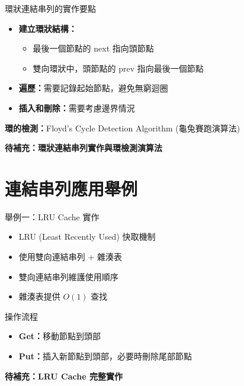 \documentclass{beamer}
\begin{document}
\begin{frame}{環狀連結串列的實作要點}
\begin{itemize}
    \item \textbf{建立環狀結構：}
    \begin{itemize}
        \item 最後一個節點的 next 指向頭節點
        \item 雙向環狀中，頭節點的 prev 指向最後一個節點
    \end{itemize}
    \item \textbf{遍歷：}需要記錄起始節點，避免無窮迴圈
    \item \textbf{插入和刪除：}需要考慮邊界情況
\end{itemize}

\vspace{1em}
\textbf{環的檢測：}Floyd's Cycle Detection Algorithm (龜兔賽跑演算法)

\vspace{1em}
\textbf{待補充：環狀連結串列實作與環檢測演算法}
\end{frame}

\section{連結串列應用舉例}

\begin{frame}{舉例一：LRU Cache 實作}
\begin{itemize}
    \item LRU (Least Recently Used) 快取機制
    \item 使用雙向連結串列 + 雜湊表
    \item 雙向連結串列維護使用順序
    \item 雜湊表提供 $O(1)$ 查找
\end{itemize}

\vspace{1em}
\begin{block}{操作流程}
\begin{itemize}
    \item \textbf{Get：}移動節點到頭部
    \item \textbf{Put：}插入新節點到頭部，必要時刪除尾部節點
\end{itemize}
\end{block}

\vspace{1em}
\textbf{待補充：LRU Cache 完整實作}
\end{frame}
\end{document}
